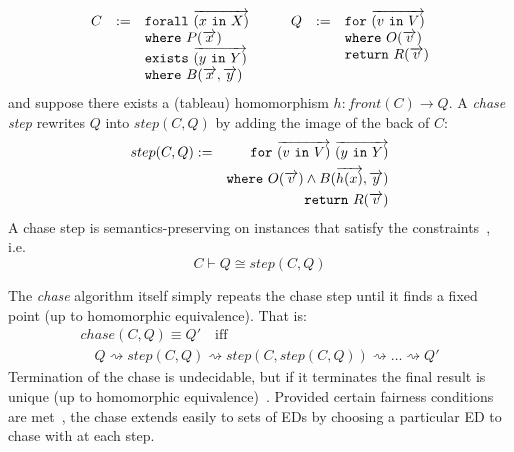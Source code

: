 \documentclass[preprint]{sigplanconf}
\newcommand{\FOR}{{\tt for}\relax\ifmmode\ \else\xspace\fi}
\newcommand{\FORALL}{{\tt forall}\relax\ifmmode\ \else\xspace\fi}
\newcommand{\EXISTS}{{\tt exists}\relax\ifmmode\ \else\xspace\fi}
\newcommand{\WHERE}{{\tt where}\relax\ifmmode\ \else\xspace\fi}
\newcommand{\IN}{ \ {\tt in} \ }
\newcommand{\RETURN}{{\tt return}\relax\ifmmode\ \else\xspace\fi}
\begin{document}
\[
\begin{array}{ccc} %
\begin{array}[t]{rcl}
 C & := & \FORALL \overrightarrow{(x \IN X)} \\
 & & \WHERE P(\overrightarrow{x}) \\
 & & \EXISTS \overrightarrow{(y \IN Y)} \\
 & & \WHERE B(\overrightarrow{x}, \overrightarrow{y})
\end{array} & &
\begin{array}[t]{rcl}
Q & := & \FOR \overrightarrow{(v \IN V)} \\
 & & \WHERE  O(\overrightarrow{v}) \\ 
 & & \RETURN R(\overrightarrow{v})
\end{array}
\end{array}
\]
and suppose there exists a (tableau) homomorphism $h : front(C) \to Q$.
A \emph{chase step} rewrites $Q$ into $step(C,Q)$ by adding the image of the back of $C$:
\begin{eqnarray*}
step(C,Q) & := & \FOR \overrightarrow{(v \IN V)} \ \overrightarrow{(y \IN Y)} \\
 & & \WHERE  O(\overrightarrow{v}) \wedge B(\overrightarrow{h(x)}, \overrightarrow{y}) 
\\
 & & \RETURN R(\overrightarrow{v})
\end{eqnarray*}
A chase step is semantics-preserving on instances that satisfy the constraints~\cite{Popa99anequational}, i.e.
\[
C \vdash Q \cong step(C,Q)
\]

The {\it chase} algorithm itself simply repeats the chase step until it finds a fixed point (up to homomorphic equivalence).
That is:
\[\begin{array}{l}
chase(C,Q) \equiv Q' \quad \textrm{iff} \\
\quad Q \rightsquigarrow step(C, Q) \rightsquigarrow step(C, step(C, Q)) \rightsquigarrow \ldots \rightsquigarrow Q'
\end{array}
\]
Termination of the chase is undecidable, but if it terminates the final result is unique (up to homomorphic equivalence)~\cite{Deutsch:2006:QRC:1121995.1122010}.  Provided certain fairness conditions are met~\cite{Deutsch:2006:QRC:1121995.1122010}, the chase extends easily to sets of EDs by choosing a particular ED to chase with at each step.
\end{document}
